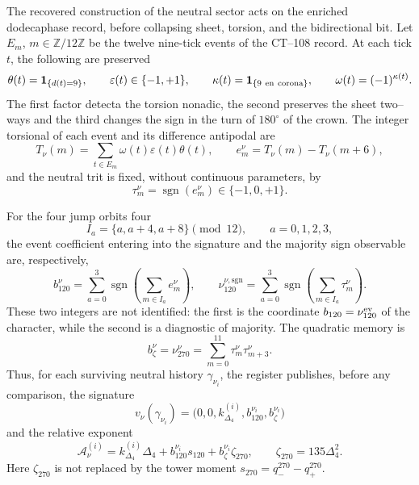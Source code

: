 The recovered construction of the neutral sector acts on the enriched
dodecaphase record, before collapsing sheet, torsion, and the
bidirectional bit. Let \(E_m\), \(m\in\mathbb Z/12\mathbb Z\) be the twelve
nine-tick events of the CT--108 record. At each tick \(t\), the following are preserved
\[
 \theta(t)=\mathbf1_{\{d(t)=9\}},\qquad
 \varepsilon(t)\in\{-1,+1\},\qquad
 \kappa(t)=\mathbf1_{\{9\ {\rm en\ corona}\}},
 \qquad \omega(t)=(-1)^{\kappa(t)}.
\]
The first factor detecta the torsion nonadic, the second preserves the sheet
two--ways and the third changes the sign in the turn of \(180^\circ\) of the
crown. The integer torsional of each event and its difference antipodal are
\begin{equation}
 T_\nu(m)=\sum_{t\in E_m}
   \omega(t)\varepsilon(t)\theta(t),\qquad
 e_m^\nu=T_\nu(m)-T_\nu(m+6),
 \label{eq:extractor-z0-torsion-antipodal-rev2}
\end{equation}
and the neutral trit is fixed, without continuous parameters, by
\begin{equation}
 \tau_m^\nu=\operatorname{sgn}(e_m^\nu)
 \in\{-1,0,+1\}.
 \label{eq:trit-neutro-torsion-antipodal-rev2}
\end{equation}

For the four jump orbits four
\[
 I_a=\{a,a+4,a+8\}\pmod{12},\qquad a=0,1,2,3,
\]
the event coefficient entering into the signature and the majority sign observable are, respectively,
\begin{equation}
 b_{120}^\nu
 =\sum_{a=0}^{3}\operatorname{sgn}
   \left(\sum_{m\in I_a}e_m^\nu\right),
 \qquad
 \nu_{120}^{\nu,\mathrm{sgn}}
 =\sum_{a=0}^{3}\operatorname{sgn}
   \left(\sum_{m\in I_a}\tau_m^\nu\right).
 \label{eq:canales-120-neutros-distintos-rev2}
\end{equation}
These two integers are not identified: the first is the coordinate
\(b_{120}=\nu_{120}^{\rm ev}\) of the character, while the second is a
diagnostic of majority. The quadratic memory is
\begin{equation}
 b_\zeta^\nu=\nu_{270}^\nu
 =\sum_{m=0}^{11}\tau_m^\nu\tau_{m+3}^\nu.
 \label{eq:canal-270-neutro-rev2}
\end{equation}
Thus, for each surviving neutral history
\(\gamma_{\nu_i}\), the register publishes, before any comparison, the signature
\[
 v_\nu(\gamma_{\nu_i})
 =\bigl(0,0,k_{\Delta_4}^{(i)},b_{120}^{\nu_i},
        b_\zeta^{\nu_i}\bigr)
\]
and the relative exponent
\begin{equation}
 \mathcal A_\nu^{(i)}
 =k_{\Delta_4}^{(i)}\Delta_4
  +b_{120}^{\nu_i}s_{120}
  +b_\zeta^{\nu_i}\zeta_{270},
 \qquad
 \zeta_{270}=135\Delta_4^2.
 \label{eq:caracter-relativo-neutro-z0-rev2}
\end{equation}
Here \(\zeta_{270}\) is not replaced by the tower moment
\(s_{270}=q_-^{270}-q_+^{270}\).

